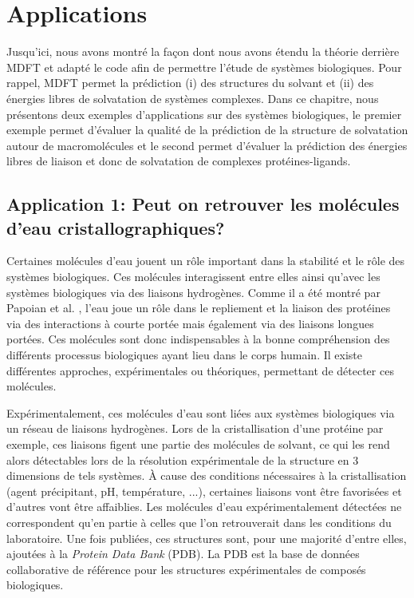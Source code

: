 \chapter{Applications}
\label{chap:applications}


Jusqu'ici, nous avons montré la façon dont nous avons étendu la théorie derrière MDFT et adapté le code afin de permettre l'étude de systèmes biologiques. Pour rappel, MDFT permet la prédiction (i) des structures du solvant et (ii) des énergies libres de solvatation de systèmes complexes. Dans ce chapitre, nous présentons deux exemples d'applications sur des systèmes biologiques, le premier exemple permet d'évaluer la qualité de la prédiction de la structure de solvatation autour de macromolécules et le second permet d'évaluer la prédiction des énergies libres de liaison et donc de solvatation de complexes protéines-ligands.


\clearpage
\section{Application 1: Peut on retrouver les molécules d'eau cristallographiques?}
Certaines molécules d'eau jouent un rôle important dans la stabilité et le rôle des systèmes biologiques. Ces molécules interagissent entre elles ainsi qu'avec les systèmes biologiques via des liaisons hydrogènes. Comme il a été montré par Papoian et al. \cite{papoian_water_2004}, l'eau joue un rôle dans le repliement et la liaison des protéines via des interactions à courte portée mais également via des liaisons longues portées. Ces molécules sont donc indispensables à la bonne compréhension des différents processus biologiques ayant lieu dans le corps humain. Il existe différentes approches, expérimentales ou théoriques, permettant de détecter ces molécules.

Expérimentalement, ces molécules d'eau sont liées aux systèmes biologiques via un réseau de liaisons hydrogènes. Lors de la cristallisation d'une protéine par exemple, ces liaisons figent une partie des molécules de solvant, ce qui les rend alors détectables lors de la résolution expérimentale de la structure en 3 dimensions de tels systèmes. À cause des conditions nécessaires à la cristallisation \cite{wlodawer_advanced_2017} (agent précipitant, pH, température, ...), certaines liaisons vont être favorisées et d'autres vont être affaiblies. Les molécules d'eau expérimentalement détectées ne correspondent qu'en partie à celles que l'on retrouverait dans les conditions du laboratoire. Une fois publiées, ces structures sont, pour une majorité d'entre elles, ajoutées à la \textit{Protein Data Bank}\cite{pdb_2011} (PDB). La PDB est la base de données collaborative de référence pour les structures expérimentales de composés biologiques.

